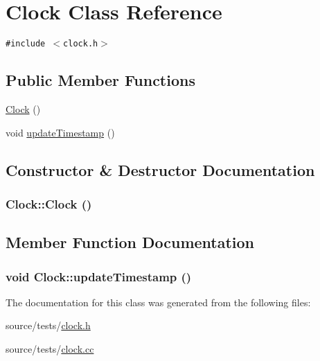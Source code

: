 \hypertarget{classClock}{
\section{Clock Class Reference}
\label{classClock}
}
{\tt \#include $<$clock.h$>$}

\subsection*{Public Member Functions}
\begin{CompactItemize}
\item 
\hyperlink{classClock_dbc370eb6b5f8d01645cf440188160a8}{Clock} ()
\item 
void \hyperlink{classClock_5e9189774442cbafe557b6735fb91c6b}{updateTimestamp} ()
\end{CompactItemize}


\subsection{Constructor \& Destructor Documentation}
\hypertarget{classClock_dbc370eb6b5f8d01645cf440188160a8}{
\subsubsection[{Clock}]{\setlength{\rightskip}{0pt plus 5cm}Clock::Clock ()}}
\label{classClock_dbc370eb6b5f8d01645cf440188160a8}




\subsection{Member Function Documentation}
\hypertarget{classClock_5e9189774442cbafe557b6735fb91c6b}{
\subsubsection[{updateTimestamp}]{\setlength{\rightskip}{0pt plus 5cm}void Clock::updateTimestamp ()}}
\label{classClock_5e9189774442cbafe557b6735fb91c6b}




The documentation for this class was generated from the following files:\begin{CompactItemize}
\item 
source/tests/\hyperlink{clock_8h}{clock.h}\item 
source/tests/\hyperlink{clock_8cc}{clock.cc}\end{CompactItemize}
